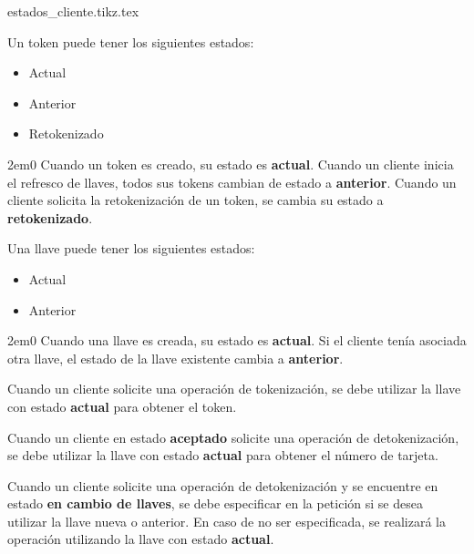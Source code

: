 \begin{sidewaysfigure}
  \begin{center}
    {estados_cliente.tikz.tex}
    \caption{Diagrama de estados de un cliente.}
    \label{estados_cliente}
  \end{center}
\end{sidewaysfigure}

{
  Un token puede tener los siguientes estados:
  \begin{itemize}
    \item Actual
    \item Anterior
    \item Retokenizado
  \end{itemize}

  \begin{hangparas}{2em}{0}
    Cuando un token es creado, su estado es \textbf{actual}.
    Cuando un cliente inicia el refresco de llaves, todos sus tokens cambian de
    estado a \textbf{anterior}.
    Cuando un cliente solicita la retokenización de un token, se cambia su estado
    a \textbf{retokenizado}.
  \end{hangparas}
}

{
  Una llave puede tener los siguientes estados:
  \begin{itemize}
    \item Actual
    \item Anterior
  \end{itemize}

  \begin{hangparas}{2em}{0}
    Cuando una llave es creada, su estado es \textbf{actual}. Si el cliente
    tenía asociada otra llave, el estado de la llave existente cambia a
    \textbf{anterior}.
  \end{hangparas}
}

{
  Cuando un cliente solicite una operación de tokenización, se debe utilizar la
  llave con estado \textbf{actual} para obtener el token.
}

{
  Cuando un cliente en estado \textbf{aceptado} solicite una operación de
  detokenización, se debe utilizar la llave con estado \textbf{actual}
  para obtener el número de tarjeta.
}

{
  Cuando un cliente solicite una operación de detokenización y se encuentre en
  estado \textbf{en cambio de llaves}, se debe especificar en la petición si
  se desea utilizar la llave nueva o anterior. En caso de no ser especificada,
  se realizará la operación utilizando la llave con estado \textbf{actual}.
}


